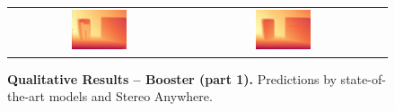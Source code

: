 \documentclass[10pt,twocolumn,letterpaper]{article}
\newcommand{\method}[0]{Stereo Anywhere\xspace}
\begin{document}
\begin{figure}[h]
\begin{tabular}{ccc}
        \includegraphics[width=0.32\textwidth]{imgs/booster/stereo/Selective/8.jpg} &
        \includegraphics[width=0.32\textwidth]{imgs/booster/stereo/Ours/8.jpg} \\

    \end{tabular}\vspace{-0.3cm}
    \caption{\textbf{Qualitative Results -- Booster (part 1).} Predictions by state-of-the-art models and \method.}
    \label{fig:qual_booster_1}\vspace{-0.3cm}
\end{figure}
\end{document}
